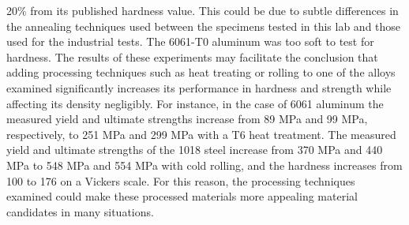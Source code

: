 \documentclass[10pt]{article}
\begin{document}
20\% from its published hardness value.  This could be due to subtle differences in the annealing techniques used between the specimens tested in this lab and those used for the industrial tests.  The 6061-T0 aluminum was too soft to test for hardness.  The results of these experiments may facilitate the conclusion that adding processing techniques such as heat treating or rolling to one of the alloys examined significantly increases its performance in hardness and strength while affecting its density negligibly.  For instance, in the case of 6061 aluminum the measured yield and ultimate strengths increase from 89 MPa and 99 MPa, respectively, to 251 MPa and 299 MPa with a T6 heat treatment.  The measured yield and ultimate strengths of the 1018 steel increase from 370 MPa and 440 MPa to 548 MPa and 554 MPa with cold rolling, and the hardness increases from 100 to 176 on a Vickers scale.  For this reason, the processing techniques examined could make these processed materials more appealing material candidates in many situations.
\end{document}
